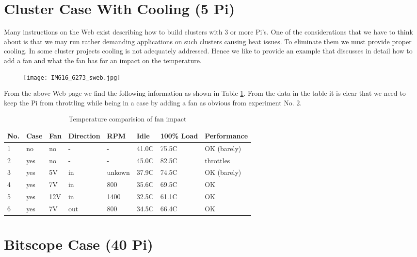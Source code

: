 \section{Cluster Case With Cooling (5 Pi)}\label{S:cluster-case-with-cooling-5-pi}

Many instructions on the Web exist describing how to build clusters with
3 or more Pi's. One of the considerations that we have to think about is
that we may run rather demanding applications on such clusters causing
heat issues. To eliminate them we must provide proper cooling. In some
cluster projects cooling is not adequately addressed. Hence we like to
provide an example that discusses in detail how to add a fan and what the
fan has for an impact on the temperature.

\begin{figure}
\centering
\texttt{[image: IMG16\_6273\_sweb.jpg]}
\caption{}
\end{figure}





From the above Web page we find the following information as shown in
Table \ref{F:pi-fan}. From the data in the table it is clear that we
need to keep the Pi from throttling while being in a case by adding a
fan as obvious from experiment No. 2.



\begin{table}[htb]
\caption{Temperature comparision of fan impact}\label{F:pi-fan}
\bigskip
\begin{center}
\begin{tabular}{llllllll}
\hline
No. & Case & Fan & Direction & RPM & Idle & 100\% Load &
Performance\tabularnewline
\hline
1 & no & no & - & - & 41.0C & 75.5C & OK (barely)\tabularnewline
2 & yes & no & - & - & 45.0C & 82.5C & throttles\tabularnewline
3 & yes & 5V & in & unkown & 37.9C & 74.5C & OK (barely)\tabularnewline
4 & yes & 7V & in & 800 & 35.6C & 69.5C & OK\tabularnewline
5 & yes & 12V & in & 1400 & 32.5C & 61.1C & OK\tabularnewline
6 & yes & 7V & out & 800 & 34.5C & 66.4C & OK\tabularnewline
\hline
\end{tabular}
\end{center}
\end{table}




\section{Bitscope Case (40 Pi)}\label{bitscope-case-40-pi}

